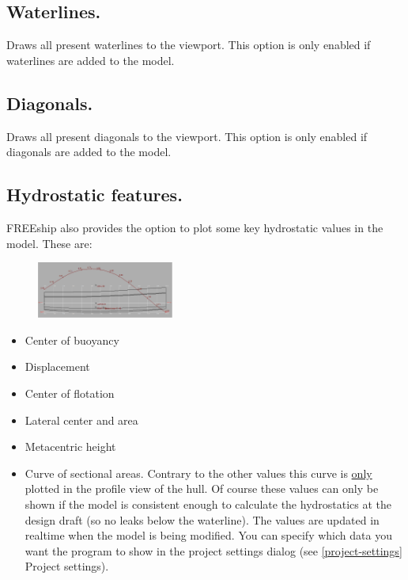 \documentclass[12pt]{article}
\begin{document}
\subsection{Waterlines.}
Draws all present waterlines to the viewport. This option is only
enabled if waterlines are added to the model.

\subsection{Diagonals.}
Draws all present diagonals to the viewport. This option is only
enabled if diagonals are added to the model.

\subsection{Hydrostatic features.} \label{hydrostatic-features}
FREEship also provides the option to plot some key hydrostatic values
in the model. These are:

\begin{figure}
        \centering
        \includegraphics[width=0.4\textwidth,natwidth=717,natheight=296]{hydrostaticfeatures.png}
        \caption{}
        \label{fig:hydrostaticfeatures}
\end{figure}

\begin{itemize}

\item Center of buoyancy

\item Displacement

\item Center of flotation

\item Lateral center and area

\item Metacentric height

\item Curve of sectional areas. Contrary to the other values this
curve is \underline{only} plotted in the profile view
of the hull. Of course these values can only be shown if the model is
consistent enough to calculate the hydrostatics at the design draft
(so no leaks below the waterline). The values are updated in realtime
when the model is being modified. You can specify which data you want
the program to show in the project settings dialog (see \ref{project-settings} Project
settings).

\end{itemize}
\end{document}
